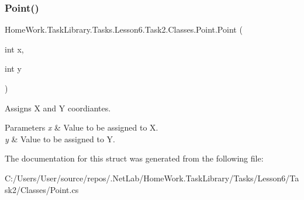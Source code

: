 \subsubsection{\texorpdfstring{Point()}{Point()}}
{\footnotesize\ttfamily Home\+Work.\+Task\+Library.\+Tasks.\+Lesson6.\+Task2.\+Classes.\+Point.\+Point (\begin{DoxyParamCaption}\item[{int}]{x,  }\item[{int}]{y }\end{DoxyParamCaption})}



Assigns X and Y coordiantes. 


\begin{DoxyParams}{Parameters}
{\em x} & Value to be assigned to X.\\
\hline
{\em y} & Value to be assigned to Y.\\
\hline
\end{DoxyParams}


The documentation for this struct was generated from the following file\+:\begin{DoxyCompactItemize}
\item 
C\+:/\+Users/\+User/source/repos/.\+Net\+Lab/\+Home\+Work.\+Task\+Library/\+Tasks/\+Lesson6/\+Task2/\+Classes/Point.\+cs\end{DoxyCompactItemize}
